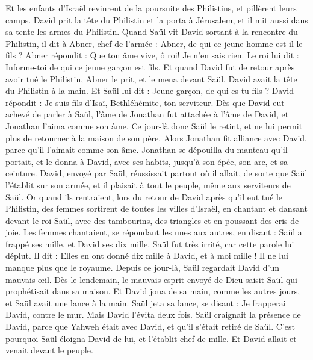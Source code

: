 \begin{multicols}{2}
Et les enfants d'Israël revinrent de la poursuite des Philistins, et pillèrent leurs camps.
David prit la tête du Philistin et la porta à Jérusalem, et il mit aussi dans sa tente les armes du Philistin.
Quand Saül vit David sortant à la rencontre du Philistin, il dit à Abner, chef de l'armée : Abner, de qui ce jeune homme est-il le fils ? Abner répondit : Que ton âme vive, ô roi! Je n'en sais rien.
Le roi lui dit : Informe-toi de qui ce jeune garçon est fils.
Et quand David fut de retour après avoir tué le Philistin, Abner le prit, et le mena devant Saül. David avait la tête du Philistin à la main.
Et Saül lui dit : Jeune garçon, de qui es-tu fils ? David répondit : Je suis fils d'Isaï, Bethléhémite, ton serviteur.
\VerseOne{}Dès que David eut achevé de parler à Saül, l'âme de Jonathan fut attachée à l'âme de David, et Jonathan l'aima comme son âme.
Ce jour-là donc Saül le retint, et ne lui permit plus de retourner à la maison de son père.
Alors Jonathan fit alliance avec David, parce qu'il l'aimait comme son âme.
Jonathan se dépouilla du manteau qu'il portait, et le donna à David, avec ses habits, jusqu'à son épée, son arc, et sa ceinture.
David, envoyé par Saül, réussissait partout où il allait, de sorte que Saül l'établit sur son armée, et il plaisait à tout le peuple, même aux serviteurs de Saül.
Or quand ils rentraient, lors du retour de David après qu’il eut tué le Philistin, des femmes sortirent de toutes les villes d'Israël, en chantant et dansant devant le roi Saül, avec des tambourins, des triangles et en poussant des cris de joie.
Les femmes chantaient, se répondant les unes aux autres, en disant : Saül a frappé ses mille, et David ses dix mille.
Saül fut très irrité, car cette parole lui déplut. Il dit : Elles en ont donné dix mille à David, et à moi mille ! Il ne lui manque plus que le royaume.
Depuis ce jour-là, Saül regardait David d’un mauvais œil.
Dès le lendemain, le mauvais esprit envoyé de Dieu saisit Saül qui prophétisait dans sa maison. Et David joua de sa main, comme les autres jours, et Saül avait une lance à la main.
Saül jeta sa lance, se disant : Je frapperai David, contre le mur. Mais David l’évita deux fois.
Saül craignait la présence de David, parce que Yahweh était avec David, et qu'il s'était retiré de Saül.
C'est pourquoi Saül éloigna David de lui, et l'établit chef de mille. Et David allait et venait devant le peuple.

\end{multicols}
